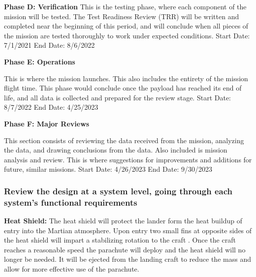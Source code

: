 \documentclass[%
 portrait,
 aapm,
 mph,%
 amsmath,amssymb,
 reprint,%
]{revtex4-2}
\begin{document}
\textbf{Phase D: Verification}
This is the testing phase, where each component of the mission will be tested. The Test Readiness Review (TRR) will be written and completed near the beginning of this period, and will conclude when all pieces of the mission are tested thoroughly to work under expected conditions. Start Date: 7/1/2021 End Date: 8/6/2022


\textbf{Phase E: Operations}

This is where the mission launches. This also includes the entirety of the mission flight time. This phase would conclude once the payload has reached its end of life, and all data is collected and prepared for the review stage. Start Date: 8/7/2022 End Date: 4/25/2023

\textbf{Phase F: Major Reviews}

This section consists of reviewing the data received from the mission, analyzing the data, and drawing conclusions from the data. Also included is mission analysis and review. This is where suggestions for improvements and  additions for future, similar missions. Start Date: 4/26/2023 End Date: 9/30/2023

\subsubsection{Review the design at a system level, going through each system’s
functional requirements}


\textbf{Heat Shield:} The heat shield will protect the lander form the heat buildup of entry into the Martian atmosphere.  Upon entry two small fins at opposite sides of the heat shield will impart a stabilizing rotation to the craft \cite{garber1961analysis}.  Once the craft reaches a reasonable speed the parachute will deploy and the heat shield will no longer be needed.  It will be ejected from the landing craft to reduce the mass and allow for more effective use of the parachute.
\end{document}
